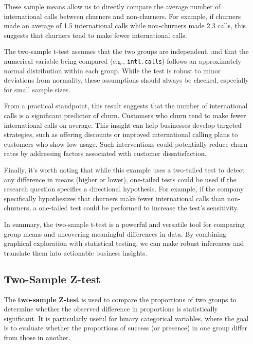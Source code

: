 \documentclass[
]{book}
\newcommand{\passthrough}[1]{#1}
\theoremstyle{definition}
\theoremstyle{definition}
\theoremstyle{definition}
\theoremstyle{definition}
\theoremstyle{remark}
\begin{document}
These sample means allow us to directly compare the average number of international calls between churners and non-churners. For example, if churners made an average of 1.5 international calls while non-churners made 2.3 calls, this suggests that churners tend to make fewer international calls.

The two-sample t-test assumes that the two groups are independent, and that the numerical variable being compared (e.g., \passthrough{\lstinline!intl.calls!}) follows an approximately normal distribution within each group. While the test is robust to minor deviations from normality, these assumptions should always be checked, especially for small sample sizes.

From a practical standpoint, this result suggests that the number of international calls is a significant predictor of churn. Customers who churn tend to make fewer international calls on average. This insight can help businesses develop targeted strategies, such as offering discounts or improved international calling plans to customers who show low usage. Such interventions could potentially reduce churn rates by addressing factors associated with customer dissatisfaction.

Finally, it's worth noting that while this example uses a two-tailed test to detect any difference in means (higher or lower), one-tailed tests could be used if the research question specifies a directional hypothesis. For example, if the company specifically hypothesizes that churners make fewer international calls than non-churners, a one-tailed test could be performed to increase the test's sensitivity.

In summary, the two-sample t-test is a powerful and versatile tool for comparing group means and uncovering meaningful differences in data. By combining graphical exploration with statistical testing, we can make robust inferences and translate them into actionable business insights.

\subsection{Two-Sample Z-test}\label{two-sample-z-test}

The \textbf{two-sample Z-test} is used to compare the proportions of two groups to determine whether the observed difference in proportions is statistically significant. It is particularly useful for binary categorical variables, where the goal is to evaluate whether the proportions of success (or presence) in one group differ from those in another.
\end{document}
